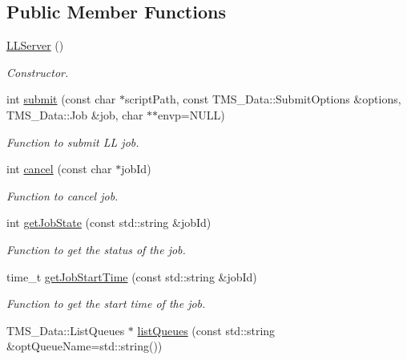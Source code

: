 \subsection*{Public Member Functions}
\begin{DoxyCompactItemize}
\item 
\hypertarget{classLLServer_a4e8e2d9350b695e53dfbfe41a673ab61}{
\hyperlink{classLLServer_a4e8e2d9350b695e53dfbfe41a673ab61}{LLServer} ()}
\label{classLLServer_a4e8e2d9350b695e53dfbfe41a673ab61}

\begin{DoxyCompactList}\small\item\em Constructor. \item\end{DoxyCompactList}\item 
int \hyperlink{classLLServer_a69115c3fd71ea7449003156d50508b37}{submit} (const char $\ast$scriptPath, const TMS\_\-Data::SubmitOptions \&options, TMS\_\-Data::Job \&job, char $\ast$$\ast$envp=NULL)
\begin{DoxyCompactList}\small\item\em Function to submit LL job. \item\end{DoxyCompactList}\item 
int \hyperlink{classLLServer_ac547f34f2fcdfb1a8950de77fd8377e1}{cancel} (const char $\ast$jobId)
\begin{DoxyCompactList}\small\item\em Function to cancel job. \item\end{DoxyCompactList}\item 
int \hyperlink{classLLServer_a9a47c22111b809031c69879f10ce4b03}{getJobState} (const std::string \&jobId)
\begin{DoxyCompactList}\small\item\em Function to get the status of the job. \item\end{DoxyCompactList}\item 
time\_\-t \hyperlink{classLLServer_a9ee6e489594d927c1c4c24fb03a16492}{getJobStartTime} (const std::string \&jobId)
\begin{DoxyCompactList}\small\item\em Function to get the start time of the job. \item\end{DoxyCompactList}\item 
TMS\_\-Data::ListQueues $\ast$ \hyperlink{classLLServer_ae804a87a0a62253ec3b90eb8d409ffd1}{listQueues} (const std::string \&optQueueName=std::string())
$$
\end{DoxyCompactItemize}
